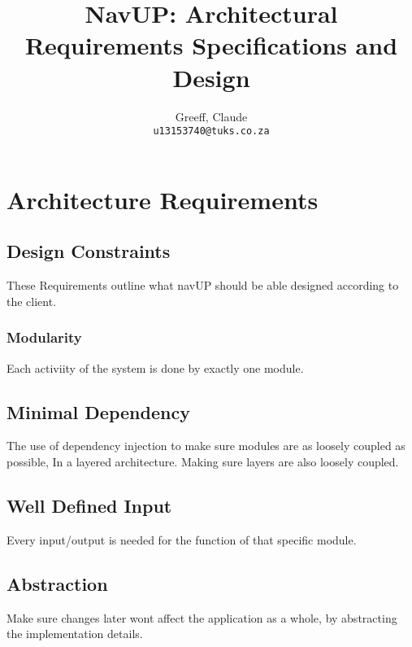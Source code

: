 \documentclass{article}
\title{NavUP: Architectural Requirements Specifications and Design}
\author{	 
	Greeff, Claude\\
	\texttt{u13153740@tuks.co.za}
	\and	
}
\begin{document}
	\maketitle
	\section{Architecture Requirements}
		\subsection{Design Constraints}
These Requirements outline what navUP should be able designed according to the client.
		 
		 \subsubsection{Modularity}
		Each activiity of the system is done by exactly one module. 

		\subsection{Minimal Dependency}
		The use of dependency injection to make sure modules are as loosely coupled as possible, In a layered architecture. Making sure layers are also loosely coupled.
		\subsection{Well Defined Input}
		Every input/output is needed for the function of that specific module.
		
		\subsection{Abstraction}
		Make sure changes later wont affect the application as a whole, by abstracting the implementation details.
		


 		
	
\end{document}
